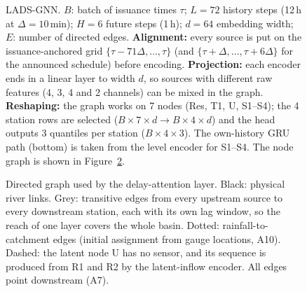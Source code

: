 \begin{figure}[H]
{}
\caption{LADS-GNN. $B$: batch of issuance times $\tau$; $L=72$ history steps (12\,h at
$\Delta=10$\,min); $H=6$ future steps (1\,h); $d=64$ embedding width; $E$: number of directed edges.
\textbf{Alignment:} every source is put on the issuance-anchored grid
$\{\tau-71\Delta,\dots,\tau\}$ (and $\{\tau+\Delta,\dots,\tau+6\Delta\}$ for the announced schedule)
before encoding. \textbf{Projection:} each encoder ends in a linear layer to width $d$, so
sources with different raw features (4, 3, 4 and 2 channels) can be mixed in the graph.
\textbf{Reshaping:} the graph works on 7 nodes (Res, T1, U, S1--S4); the 4 station rows are
selected ($B{\times}7{\times}d\to B{\times}4{\times}d$) and the head outputs 3 quantiles per
station ($B{\times}4{\times}3$). The own-history GRU path (bottom) is taken from the level
encoder for S1--S4. The node graph is shown in Figure~\ref{fig:graph}.}
\label{fig:arch}
\end{figure}

\begin{figure}[H]
\centering
{}
\caption{Directed graph used by the delay-attention layer. Black: physical river links. Grey:
transitive edges from every upstream source to every downstream station, each with its own lag
window, so the reach of one layer covers the whole basin. Dotted: rainfall-to-catchment edges
(initial assignment from gauge locations, A10). Dashed: the latent node U has no sensor, and its
sequence is produced from R1 and R2 by the latent-inflow encoder. All edges point downstream (A7).}
\label{fig:graph}
\end{figure}

